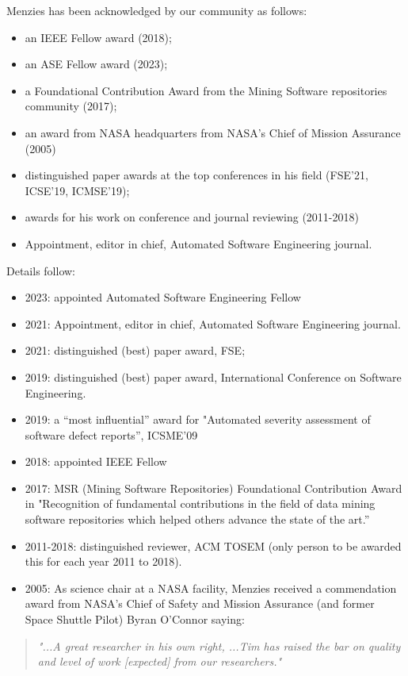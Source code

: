\documentclass[10pt]{article}
\begin{document}
Menzies has been acknowledged by our community as follows:

\begin{itemize}
\item an IEEE Fellow award (2018); 
\item an ASE Fellow award (2023); 
\item a Foundational Contribution Award from the Mining Software repositories community (2017); 
\item an award from NASA headquarters from NASA’s Chief of Mission Assurance (2005) 
\item distinguished paper awards at the top conferences in his field (FSE’21, ICSE’19, ICMSE’19); 
\item awards for his work on conference and journal reviewing (2011-2018)
\item Appointment, editor in chief, Automated Software Engineering journal.
\end{itemize}
Details follow:
\begin{itemize} 
\item 2023: appointed Automated Software Engineering Fellow
\item 2021: Appointment, editor in chief, Automated Software Engineering journal.
\item
2021: distinguished (best) paper award, FSE;
\item 2019: distinguished (best) paper award, International Conference on Software Engineering.
\item 2019: a ``most influential''  award for  "Automated severity assessment of software defect reports”, ICSME'09
\item 2018: appointed IEEE Fellow
\item 2017: MSR (Mining Software Repositories) Foundational Contribution Award in "Recognition of fundamental contributions in the field of data mining software repositories which helped others advance the state of the art.”
\item 2011-2018: distinguished reviewer, ACM TOSEM (only person to be awarded this for each year 2011 to 2018). 
\item 2005: As science chair at a NASA facility, Menzies received a commendation award from NASA’s Chief  of Safety and Mission Assurance (and former Space Shuttle Pilot) 
Byran O'Connor saying: 
\end{itemize}
\begin{mdframed}[hidealllines=true,backgroundcolor=blue!10]
\begin{center}
\begin{quote}
{\em 
    "...A great researcher in his own right, ...Tim has raised the bar on quality and level of work [expected] from our researchers."} 
\end{quote}
\end{center}
\end{mdframed}
\end{document}
